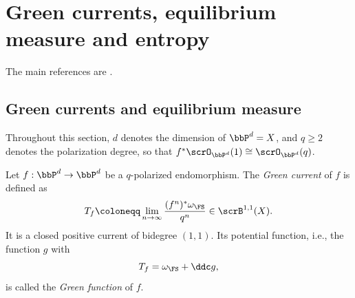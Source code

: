 \section{Green currents, equilibrium measure and entropy}

The main references are \cite{Dinh-Sibony-2010-DynamicsSeveralComplex}.


\subsection[status=draft,tag=0000000,label=\labelNFM{subsec:green-currents-and-equilibrium-measure}]{Green currents and equilibrium measure}

Throughout this section, $d$ denotes the dimension of $\bbP^d=X$, and $q \geq 2$ denotes the polarization degree,
so that $f^*\scrO_{\bbP^d}(1) \cong \scrO_{\bbP^d}(q)$.

\begin{definition}[label=\labelNFM{def:green-currents-of-dynamics}, status=draft, tag=0000000]
	Let $f: \bbP^d \to \bbP^d$ be a $q$-polarized endomorphism.
	The \emph{Green current} of $f$ is defined as
	\[ T_f \coloneqq \lim_{n \to \infty} \frac{(f^n)^*\omega_\FS}{q^n} \in \scrB^{1,1}(X). \]
	It is a closed positive current of bidegree $(1,1)$.
	Its potential function, i.e., the function $g$ with
	\[ T_f = \omega_\FS + \ddc g, \]
	is called the \emph{Green function} of $f$.
\end{definition}

